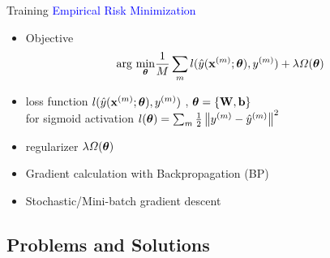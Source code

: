 	\begin{frame}[t]{Training}
		\textcolor{blue}{\Large Empirical Risk Minimization}
		\begin{itemize}
		 \item Objective
		 \begin{eqnarray}
			\text{arg}~\underset{\boldsymbol{\theta}}{\mathrm{min}} \frac{1}{M}\sum_m l(\hat{y}(\mathbf{x}^{(m)};\boldsymbol{\theta}),y^{(m)}) + \lambda \Omega(\boldsymbol{\theta})\nonumber
			\end{eqnarray}
		 \item loss function $l(\hat{y}(\mathbf{x}^{(m)};\boldsymbol{\theta}),y^{(m)})$ , $\boldsymbol{\theta} = \{\mathbf{W},\mathbf{b}\}$\\
			for sigmoid activation $l(\boldsymbol{\theta})= \sum_m \frac{1}{2} \left\| y^{(m)}-\hat{y}^{(m)}\right\| ^2$\\
		 \item regularizer $\lambda \Omega(\boldsymbol{\theta})$
		\end{itemize}
		\vspace{5mm}
		\begin{itemize}
		 \item Gradient calculation with Backpropagation (BP)
		 \item Stochastic/Mini-batch gradient descent
		\end{itemize}

		
		
	\end{frame}
	
	
	\subsection{Problems and Solutions}
		
